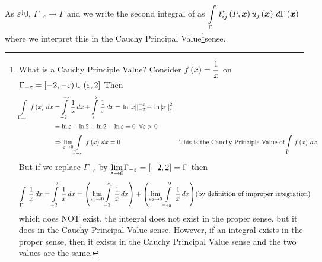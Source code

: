 As $\varepsilon^{\downarrow} 0$, $\Gamma_{-\varepsilon}\rightarrow \Gamma$ and
we write the second integral of  as $  \displaystyle\int\limits_{\Gamma}^{} \, t_{ij}^{*}\left( P,\boldsymbol{x} \right) 
   u_{j}\left( \boldsymbol{x} \right) \,d \Gamma\left( \boldsymbol{x} \right)  $ where we interpret this in
the Cauchy Principal Value\footnote{What is a Cauchy Principle Value? 
                \newline Consider $ f\left( x \right)  = \dfrac{1}{x}$ on
    $\Gamma_{-\varepsilon} = \left[ -2,-\varepsilon) \cup (\varepsilon,2 \right]$
   \newline Then
      \begin{alignat*}{2}
          \displaystyle\int\limits_{\Gamma_{-\varepsilon}}^{} \, f\left( x \right) \,dx  &=
          \displaystyle\int\limits_{-2}^{-\varepsilon} \,\dfrac{1}{x}\,dx  +
          \displaystyle\int\limits_{\varepsilon}^{2} \,\dfrac{1}{x}\,dx  
        =  \left. \ln \left| x \right| \right|_{{-2}} ^{-\varepsilon} + 
           \left. \ln\left| x \right| \right|_{{\varepsilon}} ^{2} && \\ 
          &= \ln \varepsilon -\ln 2 + \ln 2
        - \ln \varepsilon=0 \;\;\forall \varepsilon>0 && \\ & \Rightarrow
        \displaystyle{\lim_{\varepsilon \rightarrow 0}}
          \displaystyle\int\limits_{\Gamma_{-\varepsilon}}^{} \, f\left( x \right) \,dx  = 0 && 
                                \text{This is the Cauchy Principle Value of}
                          \displaystyle\int\limits_{\Gamma}^{} \, f\left( x \right) \,dx 
      \end{alignat*}
   But if we replace $\Gamma_{-\varepsilon}$  by 
   $\displaystyle{\lim_{\varepsilon\rightarrow 0}}\Gamma_{-\varepsilon} = 
   \left[ -2,2 \right]  = \Gamma$ then 
   \begin{align*}
          \displaystyle\int\limits_{\Gamma}^{} \,\dfrac{1}{x}\,dx  =   \displaystyle\int\limits_{-2}^{2} \,\dfrac{1}{x}\,dx  = \left( \displaystyle{\lim_{\varepsilon_{1} 
              \rightarrow 0}}  \displaystyle\int\limits_{-2}^{\varepsilon_{1}} \,\dfrac{1}{x}\,dx  \right)  +
        \left( \displaystyle{\lim_{\varepsilon_{2} 
              \rightarrow 0}}  \displaystyle\int\limits_{-\varepsilon_{2}}^{2} \,\dfrac{1}{x}\,dx  \right)
        &\text{(by definition of improper integration)}
    \end{align*}
    \newline which does NOT exist. \ie the integral does not exist in the
    proper sense, but it does in the Cauchy Principal Value sense. However, if
    an integral exists in the proper sense, then it exists in the Cauchy
    Principal Value sense and the two values are the same.}sense. 

